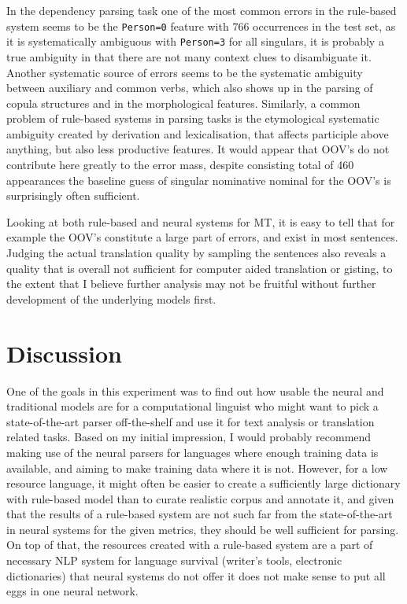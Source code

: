 \documentclass[a4paper,notitlepage]{article}
\begin{document}
In the dependency parsing task one of the most common errors in the rule-based
system seems to be the \texttt{Person=0} feature with 766 occurrences in the
test set, as it is systematically ambiguous with \texttt{Person=3} for all
singulars, it is probably a true ambiguity in that there are not many context
clues to disambiguate it. Another systematic source of errors seems to be the
systematic ambiguity between auxiliary and common verbs, which also shows up in
the parsing of copula structures and in the morphological features. Similarly, a
common problem of rule-based systems in parsing tasks is the etymological
systematic ambiguity created by derivation and lexicalisation, that affects
participle above anything, but also less productive features. It would appear
that OOV's do not contribute here greatly to the error mass, despite consisting
total of 460 appearances the baseline guess of singular nominative nominal for
the OOV's is surprisingly often sufficient.

Looking at both rule-based and neural systems for MT, it is easy to
tell that for example the OOV's constitute a large part of errors, and
exist in most sentences. Judging the actual translation quality by
sampling the sentences also reveals a quality that is overall not sufficient
for computer aided translation or gisting, to the extent that I believe
further analysis may not be fruitful without further development of the
underlying models first.

\section{Discussion}
\label{sec:discussion}

One of the goals in this experiment was to find out how usable the neural and
traditional models are for a computational linguist who might want to pick a
state-of-the-art parser off-the-shelf and use it for text analysis or
translation related tasks. Based on my initial impression, I would probably
recommend making use of the neural parsers for languages where enough training
data is available, and aiming to make training data where it is not. However,
for a low resource language, it might often be easier to create a sufficiently
large dictionary with rule-based model than to curate realistic corpus and
annotate it, and given that the results of a rule-based system are not such far
from the state-of-the-art in neural systems for the given metrics, they should
be well sufficient for parsing. On top of that, the resources created with a
rule-based system are a part of necessary NLP system for language survival
(writer's tools, electronic dictionaries) that neural systems do not offer it
does not make sense to put all eggs in one neural network.
\end{document}
